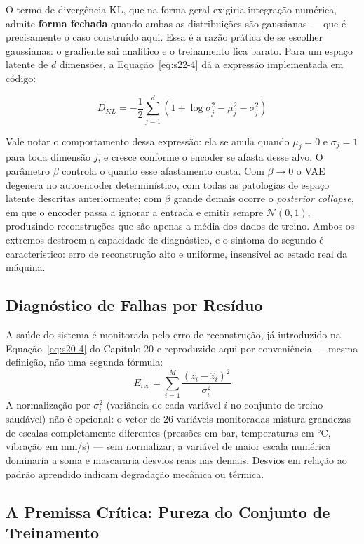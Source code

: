 \documentclass[12pt,a4paper]{article}
\numberwithin{equation}{section}
\numberwithin{table}{section}
\numberwithin{figure}{section}
\begin{document}
{	O termo de divergência KL, que na forma geral exigiria integração numérica, admite \textbf{forma fechada} quando ambas as distribuições são gaussianas — que é precisamente o caso construído aqui. Essa é a razão prática de se escolher gaussianas: o gradiente sai analítico e o treinamento fica barato. Para um espaço latente de $d$ dimensões, a Equação~\eqref{eq:s22-4} dá a expressão implementada em código:

	\begin{equation}\label{eq:s22-4}
	D_{KL} = -\frac{1}{2} \sum_{j=1}^{d} \left( 1 + \log \sigma_j^2 - \mu_j^2 - \sigma_j^2 \right)
\end{equation}

	Vale notar o comportamento dessa expressão: ela se anula quando $\mu_j = 0$ e $\sigma_j = 1$ para toda dimensão $j$, e cresce conforme o encoder se afasta desse alvo. O parâmetro $\beta$ controla o quanto esse afastamento custa. Com $\beta \to 0$ o VAE degenera no autoencoder determinístico, com todas as patologias de espaço latente descritas anteriormente; com $\beta$ grande demais ocorre o \textit{posterior collapse}, em que o encoder passa a ignorar a entrada e emitir sempre $\mathcal{N}(0,1)$, produzindo reconstruções que são apenas a média dos dados de treino. Ambos os extremos destroem a capacidade de diagnóstico, e o sintoma do segundo é característico: erro de reconstrução alto e uniforme, insensível ao estado real da máquina.

	\subsection{Diagnóstico de Falhas por Resíduo}
	A saúde do sistema é monitorada pelo erro de reconstrução, já introduzido na Equação~\eqref{eq:s20-4} do Capítulo 20 e reproduzido aqui por conveniência — mesma definição, não uma segunda fórmula:
	\begin{equation}\label{eq:s22-5}
 E_{\text{rec}} = \sum_{i=1}^{M} \frac{(z_i - \hat{z}_i)^2}{\sigma_i^2}
\end{equation}
	A normalização por $\sigma_i^2$ (variância de cada variável $i$ no conjunto de treino saudável) não é opcional: o vetor de 26 variáveis monitoradas mistura grandezas de escalas completamente diferentes (pressões em bar, temperaturas em °C, vibração em mm/s) — sem normalizar, a variável de maior escala numérica dominaria a soma e mascararia desvios reais nas demais. Desvios em relação ao padrão aprendido indicam degradação mecânica ou térmica.

	\subsection{A Premissa Crítica: Pureza do Conjunto de Treinamento}

}
\end{document}

